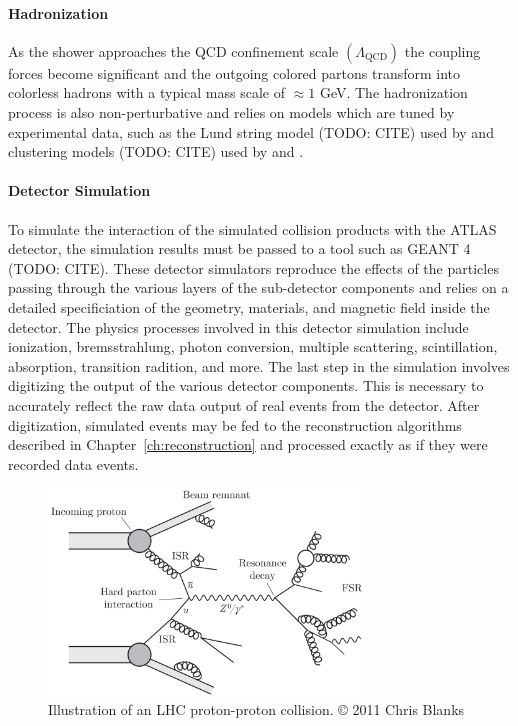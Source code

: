 \paragraph{\textbf{Hadronization}}
As the shower approaches the QCD confinement scale $(\Lambda_{\mathrm{QCD}})$ the coupling forces become significant and the outgoing colored partons transform into colorless hadrons with a typical mass scale of $\approx 1$ GeV.
The hadronization process is also non-perturbative and relies on models which are tuned by experimental data, such as the Lund string model (TODO: CITE) used by \Pythia and clustering models (TODO: CITE) used by \Herwig and \Sherpa.

\paragraph{\textbf{Detector Simulation}}
To simulate the interaction of the simulated collision products with the ATLAS detector, the simulation results must be passed to a tool such as GEANT 4 (TODO: CITE).
These detector simulators reproduce the effects of the particles passing through the various layers of the sub-detector components and relies on a detailed specificiation of the geometry, materials, and magnetic field inside the detector.
The physics processes involved in this detector simulation include ionization, bremsstrahlung, photon conversion, multiple scattering, scintillation, absorption, transition radition, and more.
The last step in the simulation involves digitizing the output of the various detector components.
This is necessary to accurately reflect the raw data output of real events from the detector.
After digitization, simulated events may be fed to the reconstruction algorithms described in Chapter~\ref{ch:reconstruction} and processed exactly as if they were recorded data events.

\begin{figure}
	\centering
	\includegraphics[width=0.75\textwidth]{pp_interaction}
	\caption{Illustration of an LHC proton-proton collision. © 2011 Chris Blanks}
	\label{fig:pp_interaction}
\end{figure}